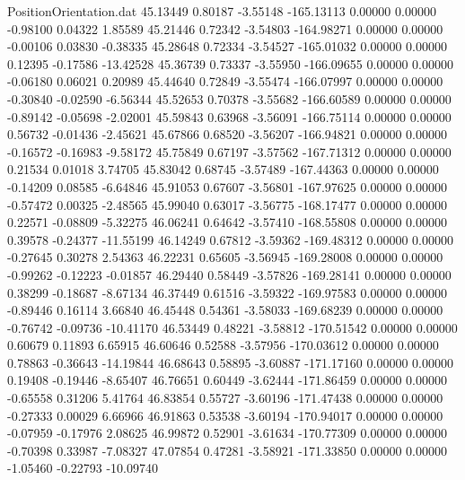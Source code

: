 \begin{filecontents}{PositionOrientation.dat}
  45.13449    0.80187   -3.55148  -165.13113    0.00000    0.00000   -0.98100    0.04322    1.85589
  45.21446    0.72342   -3.54803  -164.98271    0.00000    0.00000   -0.00106    0.03830   -0.38335
  45.28648    0.72334   -3.54527  -165.01032    0.00000    0.00000    0.12395   -0.17586  -13.42528
  45.36739    0.73337   -3.55950  -166.09655    0.00000    0.00000   -0.06180    0.06021    0.20989
  45.44640    0.72849   -3.55474  -166.07997    0.00000    0.00000   -0.30840   -0.02590   -6.56344
  45.52653    0.70378   -3.55682  -166.60589    0.00000    0.00000   -0.89142   -0.05698   -2.02001
  45.59843    0.63968   -3.56091  -166.75114    0.00000    0.00000    0.56732   -0.01436   -2.45621
  45.67866    0.68520   -3.56207  -166.94821    0.00000    0.00000   -0.16572   -0.16983   -9.58172
  45.75849    0.67197   -3.57562  -167.71312    0.00000    0.00000    0.21534    0.01018    3.74705
  45.83042    0.68745   -3.57489  -167.44363    0.00000    0.00000   -0.14209    0.08585   -6.64846
  45.91053    0.67607   -3.56801  -167.97625    0.00000    0.00000   -0.57472    0.00325   -2.48565
  45.99040    0.63017   -3.56775  -168.17477    0.00000    0.00000    0.22571   -0.08809   -5.32275
  46.06241    0.64642   -3.57410  -168.55808    0.00000    0.00000    0.39578   -0.24377  -11.55199
  46.14249    0.67812   -3.59362  -169.48312    0.00000    0.00000   -0.27645    0.30278    2.54363
  46.22231    0.65605   -3.56945  -169.28008    0.00000    0.00000   -0.99262   -0.12223   -0.01857
  46.29440    0.58449   -3.57826  -169.28141    0.00000    0.00000    0.38299   -0.18687   -8.67134
  46.37449    0.61516   -3.59322  -169.97583    0.00000    0.00000   -0.89446    0.16114    3.66840
  46.45448    0.54361   -3.58033  -169.68239    0.00000    0.00000   -0.76742   -0.09736  -10.41170
  46.53449    0.48221   -3.58812  -170.51542    0.00000    0.00000    0.60679    0.11893    6.65915
  46.60646    0.52588   -3.57956  -170.03612    0.00000    0.00000    0.78863   -0.36643  -14.19844
  46.68643    0.58895   -3.60887  -171.17160    0.00000    0.00000    0.19408   -0.19446   -8.65407
  46.76651    0.60449   -3.62444  -171.86459    0.00000    0.00000   -0.65558    0.31206    5.41764
  46.83854    0.55727   -3.60196  -171.47438    0.00000    0.00000   -0.27333    0.00029    6.66966
  46.91863    0.53538   -3.60194  -170.94017    0.00000    0.00000   -0.07959   -0.17976    2.08625
  46.99872    0.52901   -3.61634  -170.77309    0.00000    0.00000   -0.70398    0.33987   -7.08327
  47.07854    0.47281   -3.58921  -171.33850    0.00000    0.00000   -1.05460   -0.22793  -10.09740

\end{filecontents}
